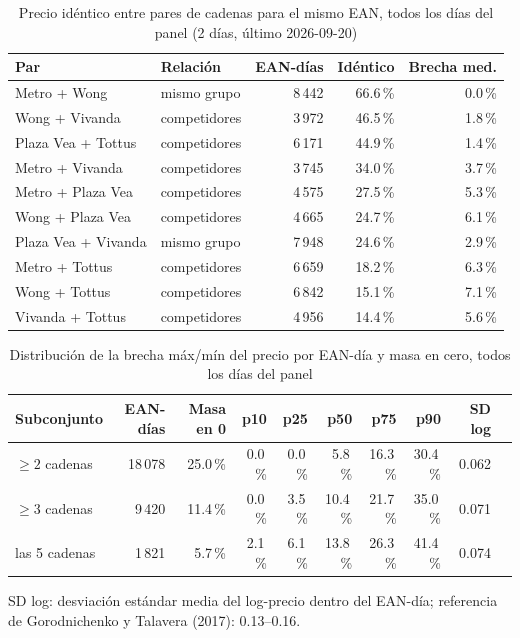 
\begin{table}[htbp]
\caption{Precio id\'entico entre pares de cadenas para el mismo EAN, todos los d\'ias del panel (2 d\'ias, \'ultimo 2026-09-20)}
\label{tab:identidad}
\centering\scriptsize\setlength{\tabcolsep}{3pt}
\begin{tabular}{@{}llrrr@{}}
\toprule
Par & Relaci\'on & EAN-d\'ias & Id\'entico & Brecha med. \\
\midrule
Metro + Wong & mismo grupo & 8\,442 & 66.6\,\% & 0.0\,\% \\
Wong + Vivanda & competidores & 3\,972 & 46.5\,\% & 1.8\,\% \\
Plaza Vea + Tottus & competidores & 6\,171 & 44.9\,\% & 1.4\,\% \\
Metro + Vivanda & competidores & 3\,745 & 34.0\,\% & 3.7\,\% \\
Metro + Plaza Vea & competidores & 4\,575 & 27.5\,\% & 5.3\,\% \\
Wong + Plaza Vea & competidores & 4\,665 & 24.7\,\% & 6.1\,\% \\
Plaza Vea + Vivanda & mismo grupo & 7\,948 & 24.6\,\% & 2.9\,\% \\
Metro + Tottus & competidores & 6\,659 & 18.2\,\% & 6.3\,\% \\
Wong + Tottus & competidores & 6\,842 & 15.1\,\% & 7.1\,\% \\
Vivanda + Tottus & competidores & 4\,956 & 14.4\,\% & 5.6\,\% \\
\bottomrule\end{tabular}\end{table}

\begin{table}[t]
\caption{Distribuci\'on de la brecha m\'ax/m\'in del precio por EAN-d\'ia y masa en cero, todos los d\'ias del panel}
\label{tab:brecha}
\centering\scriptsize\setlength{\tabcolsep}{4pt}
\begin{tabular}{@{}lrrrrrrrrr@{}}
\toprule
Subconjunto & EAN-d\'ias & Masa en 0 & p10 & p25 & p50 & p75 & p90 & SD log \\
\midrule
$\geq 2$ cadenas & 18\,078 & 25.0\,\% & 0.0\,\% & 0.0\,\% & 5.8\,\% & 16.3\,\% & 30.4\,\% & 0.062 \\
$\geq 3$ cadenas & 9\,420 & 11.4\,\% & 0.0\,\% & 3.5\,\% & 10.4\,\% & 21.7\,\% & 35.0\,\% & 0.071 \\
las 5 cadenas & 1\,821 & 5.7\,\% & 2.1\,\% & 6.1\,\% & 13.8\,\% & 26.3\,\% & 41.4\,\% & 0.074 \\
\bottomrule\end{tabular}
\par\smallskip\raggedright\scriptsize SD log: desviaci\'on est\'andar media del log-precio dentro del EAN-d\'ia; referencia de Gorodnichenko y Talavera (2017): 0.13--0.16.
\end{table}

